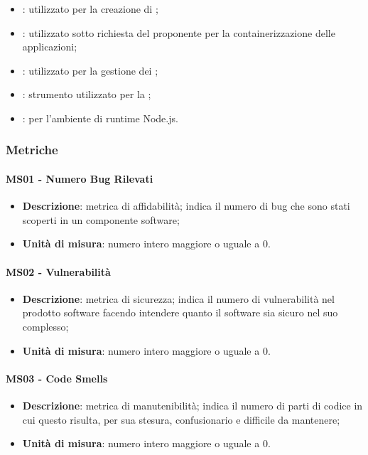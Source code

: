 \begin{itemize}
        \item \textbf{}:  utilizzato per la creazione di ;
        \item \textbf{}: utilizzato sotto richiesta del proponente per la containerizzazione delle applicazioni;
        \item \textbf{}: utilizzato per la gestione dei ;
        \item \textbf{}: strumento utilizzato per la ;
        \item \textbf{}:  per l'ambiente di runtime Node.js.
    \end{itemize}


	\subsubsection{Metriche}
		\paragraph{MS01 - Numero Bug Rilevati}
		\begin{itemize}
			\item \textbf{Descrizione}: metrica di affidabilità; indica il numero di bug che sono stati scoperti in un componente software;
			\item \textbf{Unità di misura}: numero intero maggiore o uguale a 0.
		\end{itemize}

        \paragraph{MS02 - Vulnerabilità}
        \begin{itemize}
            \item \textbf{Descrizione}: metrica di sicurezza; indica il numero di vulnerabilità nel prodotto software facendo intendere quanto il software sia sicuro nel suo complesso;
            \item \textbf{Unità di misura}: numero intero maggiore o uguale a 0.
        \end{itemize}

        \paragraph{MS03 - Code Smells}
        \begin{itemize}
            \item \textbf{Descrizione}: metrica di manutenibilità; indica il numero di parti di codice in cui questo risulta, per sua stesura, confusionario e difficile da mantenere;
            \item \textbf{Unità di misura}: numero intero maggiore o uguale a 0.
        \end{itemize}

